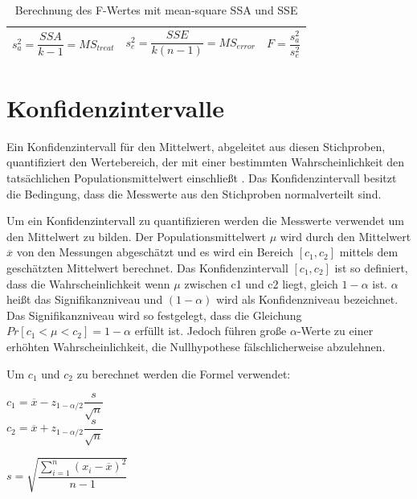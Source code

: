 \begin{center}
  \begin{table}[h!]
    \begin{tabularx}{\textwidth}{|X|X|X|}
      \hline
       $s^2_a = \dfrac{SSA}{k - 1} = MS_{treat}$ & $s^2_e = \dfrac{SSE}{k(n-1)} = MS_{error}$ & $F = \dfrac{s^2_a}{s^2_e}$\\ 
      \hline
    \end{tabularx}
    \caption{Berechnung des F-Wertes mit mean-square SSA und SSE}
    \label{tab:f_computing}
  \end{table}
\end{center}


\section{Konfidenzintervalle}

Ein Konfidenzintervall für den Mittelwert, abgeleitet aus diesen Stichproben, quantifiziert den Wertebereich, 
der mit einer bestimmten Wahrscheinlichkeit den tatsächlichen Populationsmittelwert einschließt \cite{statistically_rigorous}.
Das Konfidenzintervall besitzt die Bedingung, dass die Messwerte aus den Stichproben normalverteilt sind.

Um ein Konfidenzintervall zu quantifizieren werden die Messwerte verwendet um den Mittelwert zu bilden.
Der Populationsmittelwert $\mu$ wird durch den Mittelwert $\overline{x}$ von den Messungen abgeschätzt
und es wird ein Bereich $[c_1,c_2]$ mittels dem geschätzten Mittelwert berechnet.
Das Konfidenzintervall $[c_1, c_2]$ ist so definiert, dass die Wahrscheinlichkeit
wenn $\mu$ zwischen c1 und c2 liegt, gleich $1 - \alpha$ ist. $\alpha$ heißt das
Signifikanzniveau und $(1 - \alpha)$ wird als Konfidenzniveau bezeichnet.
Das Signifikanzniveau wird so festgelegt, dass die Gleichung $Pr[c_1 < \mu < c_2] = 1 -\alpha$ erfüllt ist. 
Jedoch führen große $\alpha$-Werte zu einer erhöhten Wahrscheinlichkeit, die Nullhypothese fälschlicherweise abzulehnen.

Um $c_1$ und $c_2$ zu berechnet werden die Formel verwendet:

\begin{center}
         $c_1 = \overline{x} - z_{1-\alpha/2} \dfrac{s}{\sqrt{n}}$ \\
         $c_2 = \overline{x} + z_{1-\alpha/2} \dfrac{s}{\sqrt{n}}$ 

\end{center}


\begin{center}
         $s = \sqrt{\dfrac{\sum_{i=1}^{n} (x_i - \overline{x})^2}{n-1}}$ 
\end{center}

